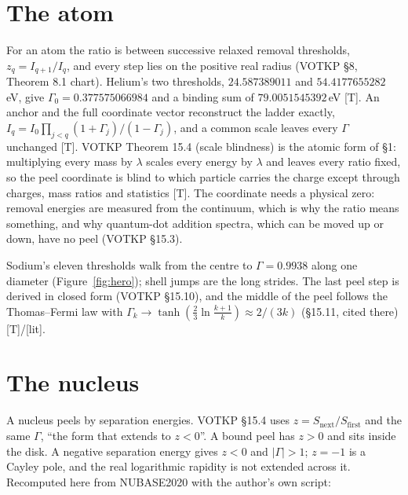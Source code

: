 \documentclass[11pt]{article}
\theoremstyle{definition}
\newcommand{\grade}[1]{\textsf{\small[#1]}}
\begin{document}
\section{The atom}
For an atom the ratio is between successive relaxed removal thresholds, $z_q=I_{q+1}/I_q$, and every step lies on the positive real radius (VOTKP §8, Theorem 8.1 chart). Helium's two thresholds, $24.587389011$ and $54.4177655282$\,eV, give $\Gamma_0=0.377575066984$ and a binding sum of $79.0051545392$\,eV \grade{T}. An anchor and the full coordinate vector reconstruct the ladder exactly, $I_q=I_0\prod_{j<q}(1+\Gamma_j)/(1-\Gamma_j)$, and a common scale leaves every $\Gamma$ unchanged \grade{T}. VOTKP Theorem 15.4 (scale blindness) is the atomic form of §1: multiplying every mass by $\lambda$ scales every energy by $\lambda$ and leaves every ratio fixed, so the peel coordinate is blind to which particle carries the charge except through charges, mass ratios and statistics \grade{T}. The coordinate needs a physical zero: removal energies are measured from the continuum, which is why the ratio means something, and why quantum-dot addition spectra, which can be moved up or down, have no peel (VOTKP §15.3).

Sodium's eleven thresholds walk from the centre to $\Gamma=0.9938$ along one diameter (Figure~\ref{fig:hero}); shell jumps are the long strides. The last peel step is derived in closed form (VOTKP §15.10), and the middle of the peel follows the Thomas–Fermi law with $\Gamma_k\to\tanh(\tfrac23\ln\tfrac{k+1}{k})\approx2/(3k)$ (§15.11, cited there) \grade{T}/\grade{lit}.

\section{The nucleus}
A nucleus peels by separation energies. VOTKP §15.4 uses $z=S_{\mathrm{next}}/S_{\mathrm{first}}$ and the same $\Gamma$, ``the form that extends to $z<0$''. A bound peel has $z>0$ and sits inside the disk. A negative separation energy gives $z<0$ and $|\Gamma|>1$; $z=-1$ is a Cayley pole, and the real logarithmic rapidity is not extended across it. Recomputed here from NUBASE2020 with the author's own script:
\end{document}
